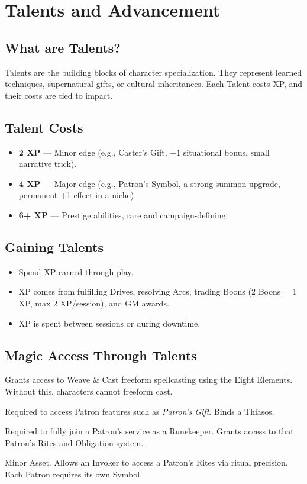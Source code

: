 

\section{Talents and Advancement}

\subsection{What are Talents?}
Talents are the building blocks of character specialization. They represent learned techniques, supernatural gifts, or cultural inheritances. 
Each Talent costs XP, and their costs are tied to impact.

\subsection{Talent Costs}
\begin{itemize}
  \item \textbf{2 XP} — Minor edge (e.g., Caster’s Gift, +1 situational bonus, small narrative trick).
  \item \textbf{4 XP} — Major edge (e.g., Patron’s Symbol, a strong summon upgrade, permanent +1 effect in a niche).
  \item \textbf{6+ XP} — Prestige abilities, rare and campaign-defining.
\end{itemize}

\subsection{Gaining Talents}
\begin{itemize}
  \item Spend XP earned through play. 
  \item XP comes from fulfilling Drives, resolving Arcs, trading Boons (2 Boons = 1 XP, max 2 XP/session), and GM awards.
  \item XP is spent between sessions or during downtime.
\end{itemize}

\subsection{Magic Access Through Talents}
\begin{description}[leftmargin=1.5em, style=nextline]
  \item[Caster’s Gift (2 XP):] Grants access to Weave \& Cast freeform spellcasting using the Eight Elements. Without this, characters cannot freeform cast.
  \item[Familiar (2 XP):] Required to access Patron features such as \emph{Patron’s Gift}. Binds a Thiasos.
  \item[Codex (4 XP):] Required to fully join a Patron’s service as a Runekeeper. Grants access to that Patron’s Rites and Obligation system.
  \item[Patron’s Symbol (4 XP):] Minor Asset. Allows an Invoker to access a Patron’s Rites via ritual precision. Each Patron requires its own Symbol.
\end{description}

